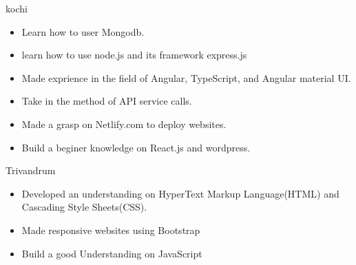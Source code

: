 \documentclass[10pt,a4paper]{altacv}
\begin{document}

\begin{fullwidth}
\makecvheader
\end{fullwidth}


 {kochi}
\begin{itemize}
\item Learn how to user Mongodb.
\item learn how to use node.js and its framework express.js
\item Made exprience in the field of Angular, TypeScript, and Angular material UI.
\item Take in the method of API service calls.
\item Made a grasp on Netlify.com to deploy websites.
\item Build a beginer knowledge on React.js and wordpress.
\end{itemize}
\medskip

\divider
\medskip

 {Trivandrum}
\begin{itemize}
\item Developed an understanding on HyperText Markup Language(HTML) and Cascading Style Sheets(CSS).
\item Made responsive websites using Bootstrap
\item Build a good Understanding on JavaScript

\end{itemize}
\medskip
\bigskip
\vspace{5mm}
\end{document}
